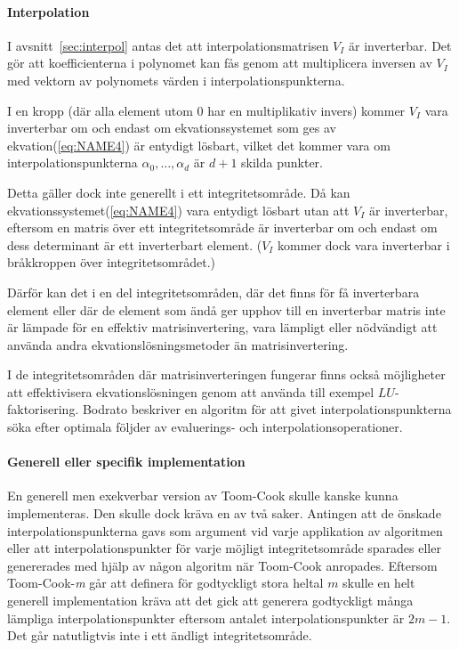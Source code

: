 \paragraph{Interpolation}
I avsnitt~\ref{sec:interpol} antas det att interpolationsmatrisen
$V_I$ är inverterbar. Det gör att koefficienterna i polynomet kan fås genom att
multiplicera inversen av $V_I$ med vektorn av polynomets värden i
interpolationspunkterna.

I en kropp (där alla element utom 0 har en multiplikativ invers) kommer $V_I$
vara inverterbar om och endast om ekvationssystemet som ges av ekvation(\ref{eq:NAME4})
är entydigt lösbart, vilket det kommer vara om interpolationspunkterna
$\alpha_0, \dots, \alpha_d$ är $d + 1$ skilda punkter.

Detta gäller dock inte generellt i ett integritetsområde. Då kan
ekvationssystemet(\ref{eq:NAME4}) vara entydigt lösbart utan att $V_I$ är
inverterbar, eftersom en matris över ett integritetsområde är inverterbar om
och endast om dess determinant är ett inverterbart
element\cite{sombatboriboon2011some}. ($V_I$ kommer dock vara inverterbar i
bråkkroppen över integritetsområdet.)

Därför kan det i en del integritetsområden, där det finns för få inverterbara element
eller där de element som ändå ger upphov till en inverterbar matris inte är
lämpade för en effektiv matrisinvertering, vara lämpligt eller nödvändigt att
använda andra ekvationslösningsmetoder än matrisinvertering.


I de integritetsområden där matrisinverteringen fungerar finns också
möjligheter att effektivisera ekvationslösningen genom att använda till exempel
$LU$-faktorisering. Bodrato\cite{bodrato2007towards}\cite{bodrato2007integer}
beskriver en algoritm för att givet interpolationspunkterna söka efter optimala
följder av evaluerings- och interpolationsoperationer.

\paragraph{Generell eller specifik implementation}
En generell men exekverbar version av Toom-Cook skulle kanske kunna
implementeras. Den skulle dock kräva en av två saker. Antingen att de önskade
interpolationspunkterna gavs som argument vid varje applikation av algoritmen
eller att interpolationspunkter för varje möjligt integritetsområde sparades
eller genererades med hjälp av någon algoritm när Toom-Cook anropades. Eftersom
Toom-Cook-\emph{m} går att definera för godtyckligt stora heltal $m$ skulle en
helt generell implementation kräva att det gick att generera godtyckligt många
lämpliga interpolationspunkter eftersom antalet interpolationspunkter är $2m-1$.
Det går natutligtvis inte i ett ändligt integritetsområde.

